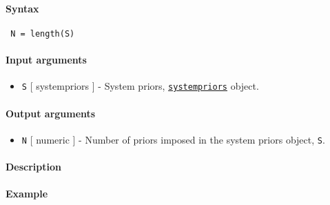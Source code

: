 


	\paragraph{Syntax}
 
 \begin{verbatim}
 N = length(S)
 \end{verbatim}
 
 \paragraph{Input arguments}
 
 \begin{itemize}
 \item
   \texttt{S} {[} systempriors {]} - System priors,
   \href{systempriors/Contents}{\texttt{systempriors}} object.
 \end{itemize}
 
 \paragraph{Output arguments}
 
 \begin{itemize}
 \item
   \texttt{N} {[} numeric {]} - Number of priors imposed in the system
   priors object, \texttt{S}.
 \end{itemize}
 
 \paragraph{Description}
 
 \paragraph{Example}


